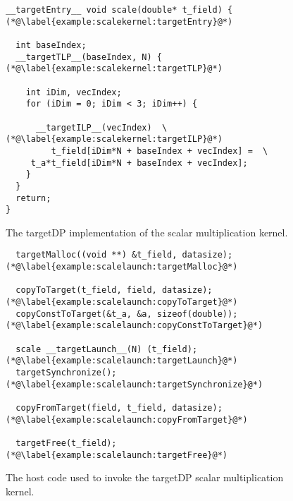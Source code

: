 \begin{figure}[h]
\begin{lstlisting}
__targetEntry__ void scale(double* t_field) { (*@\label{example:scalekernel:targetEntry}@*) 

  int baseIndex;
  __targetTLP__(baseIndex, N) { (*@\label{example:scalekernel:targetTLP}@*) 

    int iDim, vecIndex;
    for (iDim = 0; iDim < 3; iDim++) {

      __targetILP__(vecIndex)  \ (*@\label{example:scalekernel:targetILP}@*) 
         t_field[iDim*N + baseIndex + vecIndex] =  \
	 t_a*t_field[iDim*N + baseIndex + vecIndex];       	  
    }
  }
  return;
}
\end{lstlisting}
\caption{The targetDP implementation of the scalar multiplication kernel.}\label{fig:scalekernel}
\end{figure}


\begin{figure}[h]
\begin{lstlisting}
  targetMalloc((void **) &t_field, datasize); (*@\label{example:scalelaunch:targetMalloc}@*) 
  
  copyToTarget(t_field, field, datasize); (*@\label{example:scalelaunch:copyToTarget}@*) 
  copyConstToTarget(&t_a, &a, sizeof(double)); (*@\label{example:scalelaunch:copyConstToTarget}@*) 
  
  scale __targetLaunch__(N) (t_field); (*@\label{example:scalelaunch:targetLaunch}@*) 
  targetSynchronize();(*@\label{example:scalelaunch:targetSynchronize}@*) 
  
  copyFromTarget(field, t_field, datasize); (*@\label{example:scalelaunch:copyFromTarget}@*) 

  targetFree(t_field); (*@\label{example:scalelaunch:targetFree}@*) 
\end{lstlisting}
\caption{The host code used to invoke the targetDP scalar multiplication kernel.}\label{fig:scalelaunch}
\end{figure}



